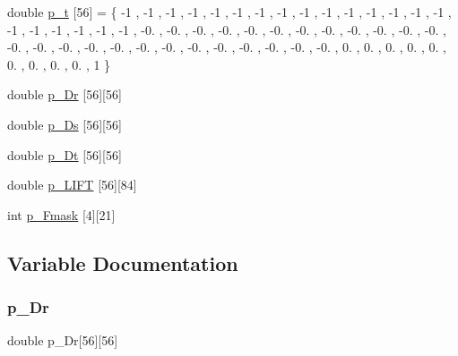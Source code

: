 \begin{DoxyCompactItemize}
\item 
double \hyperlink{a00491_aceafcfbe29f583976bc8d9dd1efee92d}{p\+\_\+t} \mbox{[}56\mbox{]} = \{ -\/1 , -\/1 , -\/1 , -\/1 , -\/1 , -\/1 , -\/1 , -\/1 , -\/1 , -\/1 , -\/1 , -\/1 , -\/1 , -\/1 , -\/1 , -\/1 , -\/1 , -\/1 , -\/1 , -\/1 , -\/1 , -\/0. , -\/0. , -\/0. , -\/0. , -\/0. , -\/0. , -\/0. , -\/0. , -\/0. , -\/0. , -\/0. , -\/0. , -\/0. , -\/0. , -\/0. , -\/0. , -\/0. , -\/0. , -\/0. , -\/0. , -\/0. , -\/0. , -\/0. , -\/0. , -\/0. , 0. , 0. , 0. , 0. , 0. , 0. , 0. , 0. , 0. , 1 \}
\item 
double \hyperlink{a00491_a13c7eb2d9e26177ca48ab596a41323ee}{p\+\_\+\+Dr} \mbox{[}56\mbox{]}\mbox{[}56\mbox{]}
\item 
double \hyperlink{a00491_aedc2e177cc4c7f961baa3029cc154e21}{p\+\_\+\+Ds} \mbox{[}56\mbox{]}\mbox{[}56\mbox{]}
\item 
double \hyperlink{a00491_ac1239fe5c431448283c668e5e0377a31}{p\+\_\+\+Dt} \mbox{[}56\mbox{]}\mbox{[}56\mbox{]}
\item 
double \hyperlink{a00491_a06de572ef449eb014ca38b302097b4d9}{p\+\_\+\+L\+I\+FT} \mbox{[}56\mbox{]}\mbox{[}84\mbox{]}
\item 
int \hyperlink{a00491_a4c7b47768e156451f6b08cb0023108ee}{p\+\_\+\+Fmask} \mbox{[}4\mbox{]}\mbox{[}21\mbox{]}
\end{DoxyCompactItemize}


\subsection{Variable Documentation}
\mbox{\label{a00491_a13c7eb2d9e26177ca48ab596a41323ee}} 
\subsubsection{\texorpdfstring{p\+\_\+\+Dr}{p\_Dr}}
{\footnotesize\ttfamily double p\+\_\+\+Dr\mbox{[}56\mbox{]}\mbox{[}56\mbox{]}}

